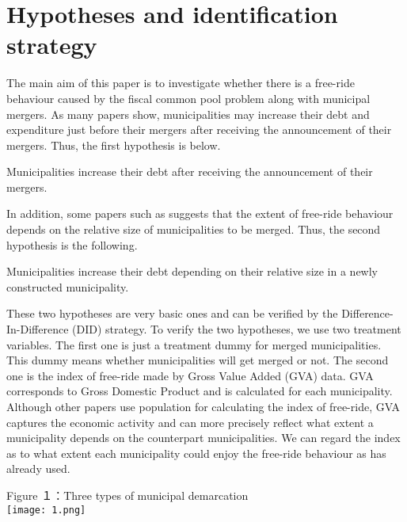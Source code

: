 \documentclass[dvipdfmx]{jsarticle}
\begin{document}
\section{Hypotheses and identification strategy}
\quad The main aim of this paper is to investigate whether there is a free-ride behaviour caused by the fiscal common pool problem along with municipal mergers. As many papers show, municipalities may increase their debt and expenditure just before their mergers after receiving the announcement of their mergers. Thus, the first hypothesis is below.
\begin{Hy}
Municipalities increase their debt after receiving the announcement of their mergers.
\end{Hy}
\quad In addition, some papers such as \cite{Hinnerich2009} suggests that the extent of free-ride behaviour depends on the relative size of municipalities to be merged. Thus, the second hypothesis is the following.
\begin{Hy}
Municipalities increase their debt depending on their relative size in a newly constructed municipality.
\end{Hy}
\quad These two hypotheses are very basic ones and can be verified by the Difference-In-Difference (DID) strategy. To verify the two hypotheses, we use two treatment variables. The first one is just a treatment dummy for merged municipalities. This dummy means whether municipalities will get merged or not. The second one is the index of free-ride made by Gross Value Added (GVA) data. GVA corresponds to Gross Domestic Product and is calculated for each municipality. Although other papers use population for calculating the index of free-ride, GVA captures the economic activity and can more precisely reflect what extent a municipality depends on the counterpart municipalities. We can regard the index as to what extent each municipality could enjoy the free-ride behaviour as \cite{Hinnerich2009} has already used.
\begin{center}Figure １：Three types of municipal demarcation\\
\texttt{[image: 1.png]}
\end{center}
\end{document}
